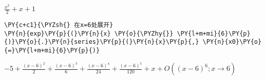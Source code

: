     $\displaystyle \frac{x^{2}}{2} + x + 1$

    

    \begin{tcolorbox}[breakable, size=fbox, boxrule=1pt, pad at break*=1mm,colback=cellbackground, colframe=cellborder]
\begin{Verbatim}[commandchars=\\\{\}]
\PY{c+c1}{\PYZsh{} 在x=6处展开}
\PY{n}{exp}\PY{p}{(}\PY{n}{x} \PY{o}{\PYZhy{}} \PY{l+m+mi}{6}\PY{p}{)}\PY{o}{.}\PY{n}{series}\PY{p}{(}\PY{n}{x}\PY{p}{,} \PY{n}{x0}\PY{o}{=}\PY{l+m+mi}{6}\PY{p}{)}
\end{Verbatim}
\end{tcolorbox}
 
            
    
    $\displaystyle -5 + \frac{\left(x - 6\right)^{2}}{2} + \frac{\left(x - 6\right)^{3}}{6} + \frac{\left(x - 6\right)^{4}}{24} + \frac{\left(x - 6\right)^{5}}{120} + x + O\left(\left(x - 6\right)^{6}; x\rightarrow 6\right)$
